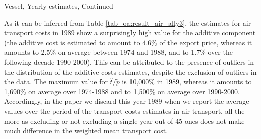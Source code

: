 \documentclass[11pt,twoside, authoryear]{elsarticle}
\begin{document}
\begin{landscape}
\begin{table}[htbp]
\begin{center}
		
		
	\end{center}
	\label{tab_oa:result_ves_ally3}%
\end{table}%

\end{landscape}

\setcounter{table}{0}

\begin{table}[htbp]
	
	\caption{Vessel, Yearly estimates, Continued}
	\begin{center}
		
		
		
	\end{center}
	\label{tab_oa:result_ves_ally3}%
\end{table}%


As it can be inferred from Table \ref{tab_oa:result_air_ally3}, the estimates for air transport costs in 1989 show a surprisingly high value for the additive component (the additive cost is estimated to amount to $4.6\%$ of the export price, whereas it amounts to 2.5\% on average between 1974 and 1988, and to 1.7\% over the following decade 1990-2000). This can be attributed to the presence of outliers in the distribution of the additive costs estimates, despite the exclusion of outliers in the data. The maximum value for $\widehat{t}/\widetilde{p}$ is 10,000\% in 1989, whereas it amounts to 1,690\% on average over 1974-1988 and to 1,500\% on average over 1990-2000. Accordingly, in the paper we discard this year 1989 when we report the average values over the period of the transport costs estimates in air transport, all the more as excluding or not excluding a single year out of 45 ones does not make much difference in the weighted mean transport cost.
\end{document}

